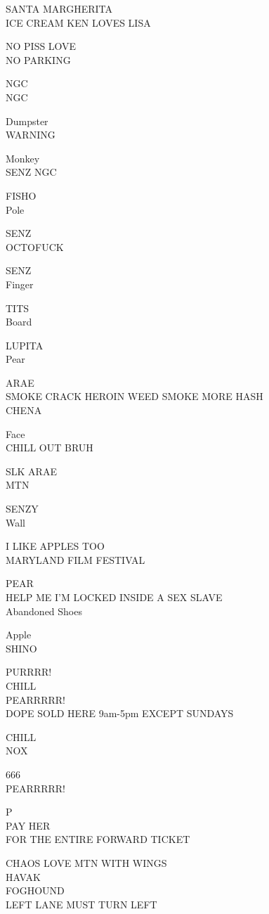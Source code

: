 \documentclass[10pt,letterpaper]{article}
\begin{document}
SANTA MARGHERITA\\
ICE CREAM KEN LOVES LISA

NO PISS LOVE\\
NO PARKING

NGC\\
NGC

Dumpster\\
WARNING

Monkey\\
SENZ NGC

FISHO\\
Pole

SENZ\\
OCTOFUCK

SENZ\\
Finger

TITS\\
Board

LUPITA\\
Pear

ARAE\\
SMOKE CRACK HEROIN WEED SMOKE MORE HASH\\
CHENA

Face\\
CHILL OUT BRUH

SLK ARAE\\
MTN

SENZY\\
Wall

I LIKE APPLES TOO\\
MARYLAND FILM FESTIVAL

PEAR\\
HELP ME I'M LOCKED INSIDE A SEX SLAVE\\
Abandoned Shoes

Apple\\
SHINO

PURRRR!\\
CHILL\\
PEARRRRR!\\
DOPE SOLD HERE 9am{-}5pm EXCEPT SUNDAYS

CHILL\\
NOX

666\\
PEARRRRR!

P\\
PAY HER\\
FOR THE ENTIRE FORWARD TICKET

CHAOS LOVE MTN WITH WINGS\\
HAVAK\\
FOGHOUND\\
LEFT LANE MUST TURN LEFT
\end{document}

